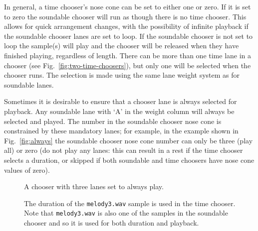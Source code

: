 \documentclass[runningheads,a4paper]{llncs}
\begin{document}
In general, a time chooser's nose cone can be set to either one or zero. If it is set to zero the soundable chooser will run as though there is no time chooser. This allows for quick arrangement changes, with the possibility of infinite playback if the soundable chooser lanes are set to loop. If the soundable chooser is not set to loop the sample(s) will play and the chooser will be released when they have finished playing, regardless of length.
There can be more than one time lane in a chooser (see Fig.~\ref{fig:two-time-choosers}), but only one will be selected when the chooser runs. The selection is made using the same lane weight system as for soundable lanes.

Sometimes it is desirable to ensure that a chooser lane is always selected for playback. Any soundable lane with `A' in the weight column will always be selected and played. The number in the soundable chooser nose cone is constrained by these mandatory lanes; for example, in the example shown in Fig.~\ref{fig:always} the soundable chooser nose cone number can only be three (play all) or zero (do not play any lanes: this can result in a rest if the time chooser selects a duration, or skipped if both soundable and time choosers have nose cone values of zero).


\begin{figure}
	\begin{floatrow}
	{\caption{A chooser with three lanes set to always play.}\label{fig:always}}
	{\caption{The duration of the \texttt{melody3.wav} sample is used in the
		time chooser. Note that \texttt{melody3.wav} is also one of the samples
		in the soundable chooser and so it is used for both duration and
		playback.}\label{fig:sample-time}}
	\end{floatrow}
\end{figure}
\end{document}
